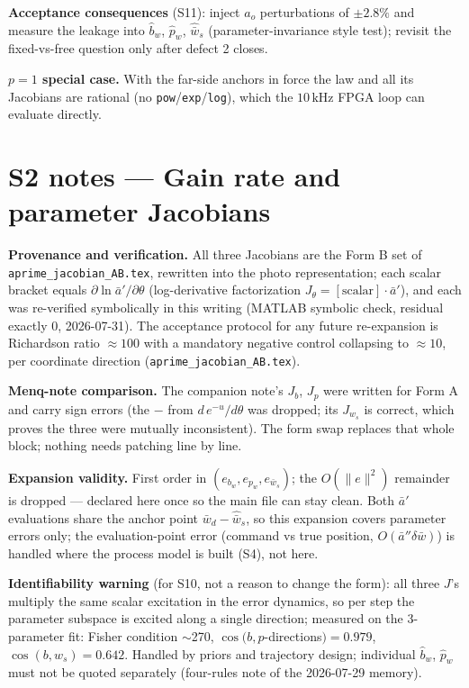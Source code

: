 \documentclass[11pt,a4paper,fontset=none]{ctexart}
\begin{document}
\textbf{Acceptance consequences} (S11): inject $a_o$ perturbations of
$\pm2.8\%$ and measure the leakage into $\hat{b}_w$, $\hat{p}_w$,
$\hat{\bar{w}}_s$ (parameter-invariance style test); revisit the
fixed-vs-free question only after defect 2 closes.

\textbf{$p=1$ special case.}  With the far-side anchors in force the law and
all its Jacobians are rational (no \texttt{pow}/\texttt{exp}/\texttt{log}),
which the $10\,\mathrm{kHz}$ FPGA loop can evaluate directly.

\section*{S2 notes --- Gain rate and parameter Jacobians}

\textbf{Provenance and verification.}  All three Jacobians are the Form B
set of \texttt{aprime\_jacobian\_AB.tex}, rewritten into the photo
representation; each scalar bracket equals
$\partial \ln \bar{a}'/\partial\theta$ (log-derivative factorization
$J_\theta = [\text{scalar}]\cdot\bar{a}'$), and each was re-verified
symbolically in this writing (MATLAB symbolic check, residual exactly $0$,
2026-07-31).  The acceptance protocol for any future
re-expansion is Richardson ratio $\approx 100$ with a mandatory negative
control collapsing to $\approx 10$, per coordinate direction
(\texttt{aprime\_jacobian\_AB.tex}).

\textbf{Menq-note comparison.}  The companion note's $J_b$, $J_p$ were
written for Form A and carry sign errors (the $-$ from
$d\,e^{-u}/d\theta$ was dropped; its $J_{w_s}$ is correct, which proves the
three were mutually inconsistent).  The form swap replaces that whole block;
nothing needs patching line by line.

\textbf{Expansion validity.}  First order in
$(e_{b_w}, e_{p_w}, e_{\bar{w}_s})$; the $O(\|e\|^2)$ remainder is dropped ---
declared here once so the main file can stay clean.  Both $\bar{a}'$
evaluations share the anchor point $\bar{w}_d-\hat{\bar{w}}_s$, so this
expansion covers parameter errors only; the evaluation-point error
(command vs true position, $O(\bar{a}''\delta\bar{w})$) is handled where the
process model is built (S4), not here.

\textbf{Identifiability warning} (for S10, not a reason to change the form):
all three $J$'s multiply the same scalar excitation in the error dynamics,
so per step the parameter subspace is excited along a single direction;
measured on the 3-parameter fit: Fisher condition $\sim$270,
$\cos(b,p$-directions$) = 0.979$, $\cos(b,w_s) = 0.642$.  Handled by priors
and trajectory design; individual $\hat{b}_w$, $\hat{p}_w$ must not be
quoted separately (four-rules note of the 2026-07-29 memory).
\end{document}
